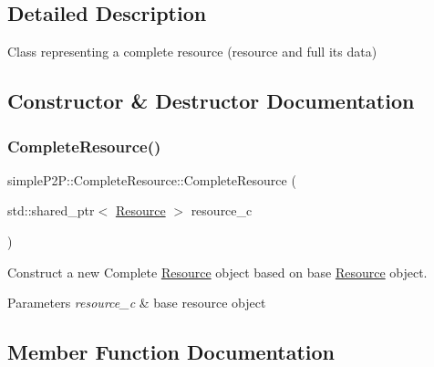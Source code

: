 \subsection{Detailed Description}
Class representing a complete resource (resource and full its data) 



\subsection{Constructor \& Destructor Documentation}
\mbox{\label{classsimpleP2P_1_1CompleteResource_a758df5fa183938450b71d1e36af8fbaf}} 
\subsubsection{\texorpdfstring{Complete\+Resource()}{CompleteResource()}}
{\footnotesize\ttfamily simple\+P2\+P\+::\+Complete\+Resource\+::\+Complete\+Resource (\begin{DoxyParamCaption}\item[{std\+::shared\+\_\+ptr$<$ \hyperlink{classsimpleP2P_1_1Resource}{Resource} $>$}]{resource\+\_\+c }\end{DoxyParamCaption})}



Construct a new Complete \hyperlink{classsimpleP2P_1_1Resource}{Resource} object based on base \hyperlink{classsimpleP2P_1_1Resource}{Resource} object. 


\begin{DoxyParams}{Parameters}
{\em resource\+\_\+c} & base resource object \\
\hline
\end{DoxyParams}


\subsection{Member Function Documentation}
\mbox{\label{classsimpleP2P_1_1CompleteResource_a28c22b852e21d864086440b82822ffa3}} 
